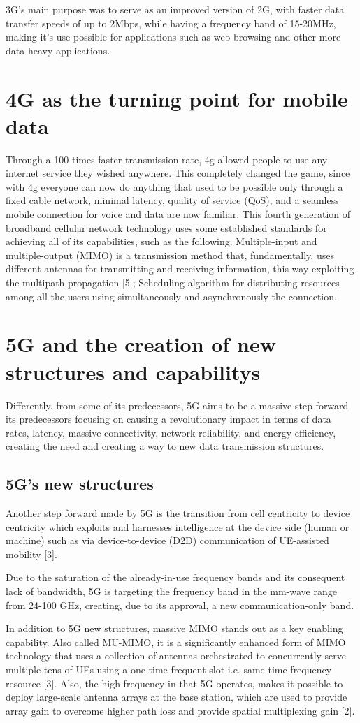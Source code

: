 \documentclass[10pt,journal,compsoc]{IEEEtran}
\begin{document}
3G's main purpose was to serve as an improved version of 2G, with faster data transfer speeds of up to 2Mbps, while having a frequency band of 15-20MHz, making it's use possible for applications such as web browsing and other more data heavy applications.

\section{4G as the turning point for mobile data}

Through a 100 times faster transmission rate, 4g allowed people to use any internet service they wished anywhere. This completely changed the game, since with 4g everyone can now do anything that used to be possible only through a fixed cable network, minimal latency, quality of service (QoS), and a seamless mobile connection for voice and data are now familiar.
This fourth generation of broadband cellular network technology uses some established standards for achieving all of its capabilities, such as the following. 
Multiple-input and multiple-output (MIMO) is a transmission method that, fundamentally, uses different antennas for transmitting and receiving information, this way exploiting the multipath propagation [5]; Scheduling algorithm for distributing resources among all the users using simultaneously and asynchronously the connection.

\section{5G and the creation of new structures and capabilitys}
Differently, from some of its predecessors, 5G aims to be a massive step forward its predecessors focusing on causing a revolutionary impact in terms of data rates, latency, massive connectivity, network reliability, and energy efficiency, creating the need and creating a way to new data transmission structures.\par
\subsection*{5G's new structures}
Another step forward made by 5G is the transition from cell centricity to device centricity which exploits and harnesses intelligence at the device side (human or machine) such as via device-to-device (D2D) communication of UE-assisted mobility [3].\par
Due to the saturation of the already-in-use frequency bands and its consequent lack of bandwidth, 5G is targeting the frequency band in the mm-wave range from 24-100 GHz, creating, due to its approval, a new communication-only band.\par
In addition to 5G new structures, massive MIMO stands out as a key enabling capability. Also called MU-MIMO, it is a significantly enhanced form of MIMO technology that uses a collection of antennas orchestrated to concurrently serve multiple tens of UEs using a one-time frequent slot i.e. same time-frequency resource [3]. Also, the high frequency in that 5G operates, makes it possible to deploy large-scale antenna arrays at the base station, which are used to provide array gain to overcome higher path loss and provide spatial multiplexing gain [2].\par
\end{document}
